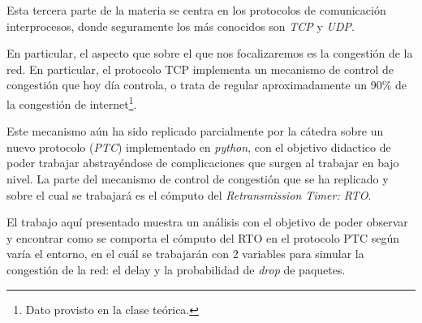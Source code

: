 Esta tercera parte de la materia se centra en los protocolos de comunicaci\'on
interprocesos, donde seguramente los m\'as conocidos son
\textit{TCP}\cite{rfc675} y \textit{UDP}\cite{rfc768}.

\par En particular, el aspecto que sobre el que nos focalizaremos es la
congesti\'on de la red. En particular, el protocolo TCP implementa un mecanismo
de control de congesti\'on\cite{rfc5681} que hoy d\'ia controla, o trata de
regular aproximadamente un 90\% de la congesti\'on de internet\footnote{Dato
provisto en la clase te\'orica.}.

\par Este mecanismo a\'un ha sido replicado parcialmente por la c\'atedra sobre
un nuevo protocolo (\textit{PTC\cite{ptc}}) implementado en
\textit{python}\cite{python}, con el objetivo didactico de poder trabajar
abstray\'endose de complicaciones que surgen al trabajar en bajo nivel. La
parte del mecanismo de control de congesti\'on que se ha replicado y sobre el
cual se trabajar\'a es el c\'omputo del \textit{Retransmission Timer:
RTO}\cite{rfc6298}.

\par El trabajo aqu\'i presentado muestra un an\'alisis con el objetivo de
poder observar y encontrar como se comporta el c\'omputo del RTO en el
protocolo PTC seg\'un var\'ia el entorno, en el cu\'al se trabajar\'an con 2
variables para simular la congesti\'on de la red: el delay y la probabilidad de
\textit{drop} de paquetes.
